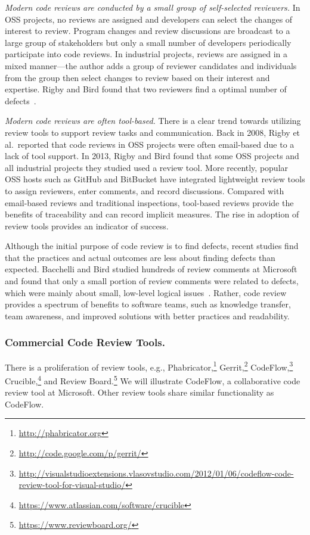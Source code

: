 \documentclass[runningheads,a4paper]{llncs}
\begin{document}
{\it Modern code reviews are conducted by a small group of self-selected reviewers.} 
In OSS projects, no reviews are assigned and developers can select the changes of interest to review. Program changes and review discussions are broadcast to a large group of stakeholders but only a small number of developers periodically participate into code reviews. In industrial projects, reviews are assigned in a mixed manner---the author adds a group of reviewer candidates and individuals from the group then select changes to review based on their interest and expertise. Rigby and Bird found that two reviewers find a optimal number of defects~\cite{rigby2013convergent}.

{\it Modern code reviews are often tool-based.} There is a clear trend towards utilizing review tools to support review tasks and communication. Back in 2008, Rigby et al.~reported that code reviews in OSS projects were often email-based due to a lack of tool support. In 2013, Rigby and Bird found that some OSS projects and all industrial projects they studied used a review tool. More recently, popular OSS hosts such as GitHub and BitBucket have integrated lightweight review tools to assign reviewers, enter comments, and record discussions. Compared with email-based reviews and traditional inspections, tool-based reviews provide the benefits of traceability and can record implicit measures. The rise in adoption of review tools provides an indicator of success.

Although the initial purpose of code review is to find defects, recent studies find that the practices and actual outcomes are less about finding defects than expected. Bacchelli and Bird studied hundreds of review comments at Microsoft and found that only a small portion of review comments were related to defects, which were mainly about small, low-level logical issues~\cite{bacchelli2013expectations}. Rather, code review provides a spectrum of benefits to software teams, such as knowledge transfer, team awareness, and improved solutions with better practices and readability. 

\subsubsection{Commercial Code Review Tools.} 

There is a proliferation of review tools, e.g., Phabricator,\footnote{\url{http://phabricator.org}} Gerrit,\footnote{\url{http://code.google.com/p/gerrit/}} CodeFlow,\footnote{\url{http://visualstudioextensions.vlasovstudio.com/2012/01/06/codeflow-code-review-tool-for-visual-studio/}} Crucible,\footnote{\url{https://www.atlassian.com/software/crucible}} and Review Board.\footnote{\url{https://www.reviewboard.org/}} We will illustrate CodeFlow, a collaborative code review tool at Microsoft. Other review tools share similar functionality as CodeFlow.
\end{document}

